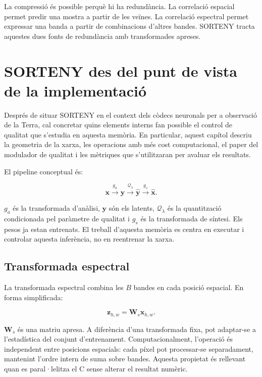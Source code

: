 La compressió és possible perquè hi ha redundància. La correlació espacial
permet predir una mostra a partir de les veïnes. La correlació espectral permet
expressar una banda a partir de combinacions d'altres bandes. SORTENY tracta
aquestes dues fonts de redundància amb transformades apreses.

\section{SORTENY des del punt de vista de la implementació}
\label{sec:arquitectura}

Després de situar SORTENY en el context dels còdecs neuronals per a observació
de la Terra, cal concretar quins elements interns fan possible el control de
qualitat que s'estudia en aquesta memòria. En particular, aquest capítol
descriu la geometria de la xarxa, les operacions amb més cost computacional, el
paper del modulador de qualitat i les mètriques que s'utilitzaran per avaluar
els resultats.

El pipeline conceptual és:

\begin{equation}
\mathbf{x}\xrightarrow{g_a}
\mathbf{y}\xrightarrow{\mathcal{Q}_{\lambda}}
\hat{\mathbf{y}}\xrightarrow{g_s}\hat{\mathbf{x}}.
\label{eq:sorteny_pipeline}
\end{equation}

$g_a$ és la transformada d'anàlisi, $\mathbf{y}$ són els latents,
$\mathcal{Q}_{\lambda}$ és la quantització condicionada pel paràmetre de
qualitat i $g_s$ és la transformada de síntesi. Els pesos ja estan entrenats.
El treball d'aquesta memòria es centra en executar i controlar aquesta
inferència, no en reentrenar la xarxa.

\subsection{Transformada espectral}

La transformada espectral combina les $B$ bandes en cada posició espacial. En
forma simplificada:

\begin{equation}
\mathbf{z}_{h,w}=\mathbf{W}_{s}\mathbf{x}_{h,w}.
\label{eq:spectral_transform}
\end{equation}

$\mathbf{W}_{s}$ és una matriu apresa. A diferència d'una transformada fixa,
pot adaptar-se a l'estadística del conjunt d'entrenament. Computacionalment,
l'operació és independent entre posicions espacials: cada píxel pot processar-se
separadament, mantenint l'ordre intern de suma sobre bandes. Aquesta propietat
és rellevant quan es paral·lelitza el C sense alterar el resultat numèric.

